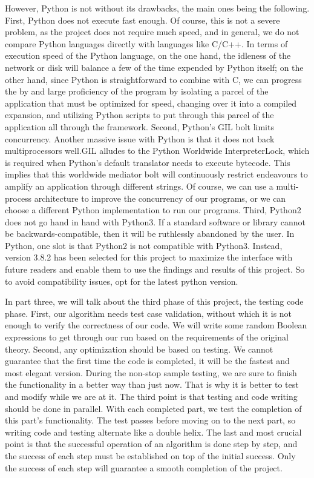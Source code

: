 \documentclass{sigchi}
\begin{document}
However, Python is not without its drawbacks, the main ones being the following. First, Python does not execute fast enough. Of course, this is not a severe problem, as the project does not require much speed, and in general, we do not compare Python languages directly with languages like C/C++. In terms of execution speed of the Python language, on the one hand, the idleness of the network or disk will balance a few of the time expended by Python itself; on the other hand, since Python is straightforward to combine with C, we can progress the by and large proficiency of the program by isolating a parcel of the application that must be optimized for speed, changing over it into a compiled expansion, and utilizing Python scripts to put through this parcel of the application all through the framework. Second, Python's GIL bolt limits concurrency. Another massive issue with Python is that it does not back multiprocessors well.GIL alludes to the Python Worldwide InterpreterLock, which is required when Python's default translator needs to execute bytecode. This implies that this worldwide mediator bolt will continuously restrict endeavours to amplify an application through different strings. Of course, we can use a multi-process architecture to improve the concurrency of our programs, or we can choose a different Python implementation to run our programs. Third, Python2 does not go hand in hand with Python3. If a standard software or library cannot be backwards-compatible, then it will be ruthlessly abandoned by the user. In Python, one slot is that Python2 is not compatible with Python3. Instead, version 3.8.2 has been selected for this project to maximize the interface with future readers and enable them to use the findings and results of this project. So to avoid compatibility issues, opt for the latest python version.

In part three, we will talk about the third phase of this project, the testing code phase. First, our algorithm needs test case validation, without which it is not enough to verify the correctness of our code. We will write some random Boolean expressions to get through our run based on the requirements of the original theory. Second, any optimization should be based on testing. We cannot guarantee that the first time the code is completed, it will be the fastest and most elegant version. During the non-stop sample testing, we are sure to finish the functionality in a better way than just now. That is why it is better to test and modify while we are at it. The third point is that testing and code writing should be done in parallel. With each completed part, we test the completion of this part's functionality. The test passes before moving on to the next part, so writing code and testing alternate like a double helix. The last and most crucial point is that the successful operation of an algorithm is done step by step, and the success of each step must be established on top of the initial success. Only the success of each step will guarantee a smooth completion of the project.
\end{document}
